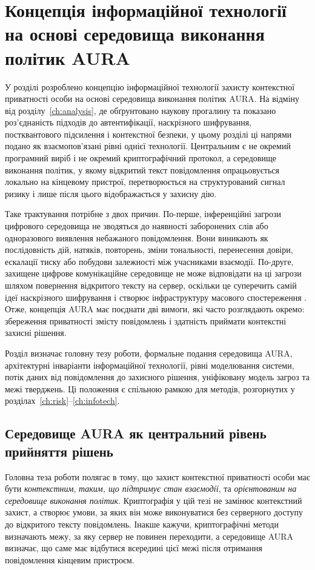 \chapter{Концепція інформаційної технології на основі середовища виконання політик AURA}
\label{ch:concept}

У розділі розроблено концепцію інформаційної технології захисту контекстної приватності особи на основі середовища виконання політик AURA. На відміну від розділу~\ref{ch:analysis}, де обґрунтовано наукову прогалину та показано роз'єднаність підходів до автентифікації, наскрізного шифрування, постквантового підсилення і контекстної безпеки, у цьому розділі ці напрями подано як взаємопов'язані рівні однієї технології. Центральним є не окремий програмний виріб і не окремий криптографічний протокол, а середовище виконання політик, у якому відкритий текст повідомлення опрацьовується локально на кінцевому пристрої, перетворюється на структурований сигнал ризику і лише після цього відображається у захисну дію.

Таке трактування потрібне з двох причин. По-перше, інференційні загрози цифрового середовища не зводяться до наявності заборонених слів або одноразового виявлення небажаного повідомлення. Вони виникають як послідовність дій, натяків, повторень, зміни тональності, перенесення довіри, ескалації тиску або побудови залежності між учасниками взаємодії. По-друге, захищене цифрове комунікаційне середовище не може відповідати на ці загрози шляхом повернення відкритого тексту на сервер, оскільки це суперечить самій ідеї наскрізного шифрування і створює інфраструктуру масового спостереження \cite{scheffler2023sok,abelson2024bugs,kamara2021outside}. Отже, концепція AURA має поєднати дві вимоги, які часто розглядають окремо: збереження приватності змісту повідомлень і здатність приймати контекстні захисні рішення.

Розділ визначає головну тезу роботи, формальне подання середовища AURA, архітектурні інваріанти інформаційної технології, рівні моделювання системи, потік даних від повідомлення до захисного рішення, уніфіковану модель загроз та межі тверджень. Ці положення є спільною рамкою для методів, розгорнутих у розділах~\ref{ch:risk}--\ref{ch:infotech}.

\section{Середовище AURA як центральний рівень прийняття рішень}
\label{sec:aura-core-idea}

Головна теза роботи полягає в тому, що захист контекстної приватності особи має бути \emph{контекстним}, \emph{таким, що підтримує стан взаємодії}, та \emph{орієнтованим на середовище виконання політик}. Криптографія у цій тезі не замінює контекстний захист, а створює умови, за яких він може виконуватися без серверного доступу до відкритого тексту повідомлень. Інакше кажучи, криптографічні методи визначають межу, за яку сервер не повинен переходити, а середовище AURA визначає, що саме має відбутися всередині цієї межі після отримання повідомлення кінцевим пристроєм.


